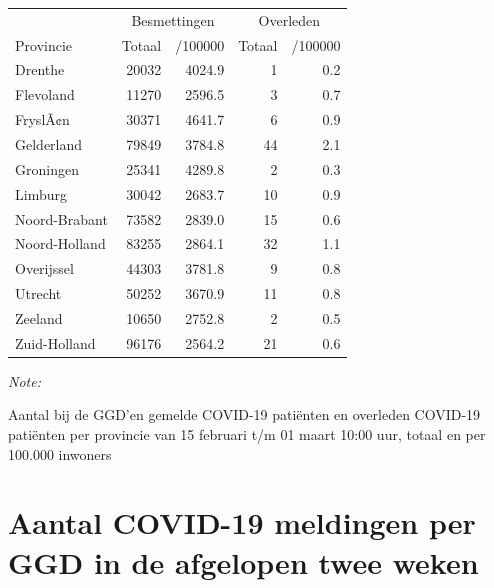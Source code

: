 \documentclass[
  english,
  man,floatsintext]{apa6}
\begin{document}
\begin{table}
\centering
\begin{threeparttable}
\begin{tabular}{lrrrr}
\toprule
\multicolumn{1}{c}{ } & \multicolumn{2}{c}{Besmettingen} & \multicolumn{2}{c}{Overleden} \\
\cmidrule(l{3pt}r{3pt}){2-3} \cmidrule(l{3pt}r{3pt}){4-5}
Provincie & Totaal & /100000 & Totaal & /100000\\
\midrule
Drenthe & 20032 & 4024.9 & 1 & 0.2\\
Flevoland & 11270 & 2596.5 & 3 & 0.7\\
FryslÃ¢n & 30371 & 4641.7 & 6 & 0.9\\
Gelderland & 79849 & 3784.8 & 44 & 2.1\\
Groningen & 25341 & 4289.8 & 2 & 0.3\\
Limburg & 30042 & 2683.7 & 10 & 0.9\\
Noord-Brabant & 73582 & 2839.0 & 15 & 0.6\\
Noord-Holland & 83255 & 2864.1 & 32 & 1.1\\
Overijssel & 44303 & 3781.8 & 9 & 0.8\\
Utrecht & 50252 & 3670.9 & 11 & 0.8\\
Zeeland & 10650 & 2752.8 & 2 & 0.5\\
Zuid-Holland & 96176 & 2564.2 & 21 & 0.6\\
\bottomrule
\end{tabular}
\begin{tablenotes}
\item \textit{Note: } 
\item Aantal bij de GGD’en gemelde COVID-19 patiënten en overleden COVID-19 patiënten per provincie van 15 februari t/m 01 maart 10:00 uur, totaal en per 100.000 inwoners
\end{tablenotes}
\end{threeparttable}
\end{table}

\newpage

\hypertarget{aantal-covid-19-meldingen-per-ggd-in-de-afgelopen-twee-weken}{%
\section{Aantal COVID-19 meldingen per GGD in de afgelopen twee weken}\label{aantal-covid-19-meldingen-per-ggd-in-de-afgelopen-twee-weken}}
\end{document}
